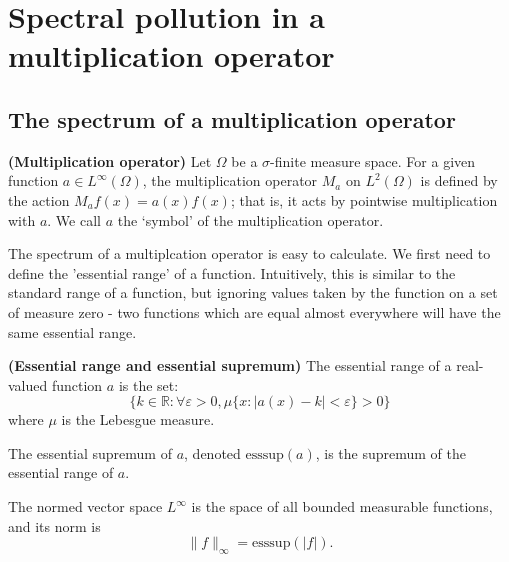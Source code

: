 \documentclass[../main.tex]{subfiles}
\begin{document}
\section{Spectral pollution in a multiplication operator}
\subsection{The spectrum of a multiplication operator}
\begin{definition}{\textbf{(Multiplication operator)}}
Let $\Omega$ be a $\sigma$-finite measure space.
For a given function $a \in L^\infty(\Omega)$, the multiplication operator $M_a$ on $L^2(\Omega)$ is defined by
the action $M_af(x) = a(x)f(x)$; that is, it acts by pointwise multiplication with $a$. We call $a$ the `symbol' of
the multiplication operator.
\end{definition}

The spectrum of a multiplcation operator is easy to calculate. We first
need to define the 'essential range' of a function. Intuitively, this is
similar to the standard range of a function, but ignoring values taken by
the function on a set of measure zero - two functions which are equal
almost everywhere will have the same essential range.

\begin{definition}{\textbf{(Essential range and essential supremum)}}\label{defn:essential-range}
  The essential range of a real-valued function $a$ is the set:
  $$\{k \in \mathbb{R} : \forall \varepsilon > 0, \mu\{x : |a(x) - k| < \varepsilon\} > 0\}$$
  where $\mu$ is the Lebesgue measure.
  
  The essential supremum of $a$, denoted $\text{esssup}(a)$, is the supremum of the essential range of $a$.
\end{definition}

The normed vector space $L^\infty$ is the space of all bounded measurable functions, and its norm is $$\|f\|_\infty = \text{esssup}(|f|).$$
\end{document}
